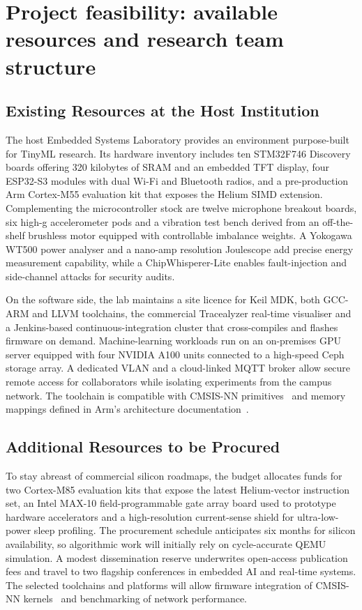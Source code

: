 \section{Project feasibility: available resources and research team structure}

\subsection{Existing Resources at the Host Institution}
The host Embedded Systems Laboratory provides an environment purpose-built for TinyML research. Its hardware inventory includes ten STM32F746 Discovery boards offering 320 kilobytes of SRAM and an embedded TFT display, four ESP32-S3 modules with dual Wi-Fi and Bluetooth radios, and a pre-production Arm Cortex-M55 evaluation kit that exposes the Helium SIMD extension. Complementing the microcontroller stock are twelve microphone breakout boards, six high-g accelerometer pods and a vibration test bench derived from an off-the-shelf brushless motor equipped with controllable imbalance weights. A Yokogawa WT500 power analyser and a nano-amp resolution Joulescope add precise energy measurement capability, while a ChipWhisperer-Lite enables fault-injection and side-channel attacks for security audits.

On the software side, the lab maintains a site licence for Keil MDK, both GCC-ARM and LLVM toolchains, the commercial Tracealyzer real-time visualiser and a Jenkins-based continuous-integration cluster that cross-compiles and flashes firmware on demand. Machine-learning workloads run on an on-premises GPU server equipped with four NVIDIA A100 units connected to a high-speed Ceph storage array. A dedicated VLAN and a cloud-linked MQTT broker allow secure remote access for collaborators while isolating experiments from the campus network. The toolchain is compatible with CMSIS-NN primitives~\cite{arm2023cmsislib} and memory mappings defined in Arm's architecture documentation~\cite{arm2023memmodel}.

\subsection{Additional Resources to be Procured}
To stay abreast of commercial silicon roadmaps, the budget allocates funds for two Cortex-M85 evaluation kits that expose the latest Helium-vector instruction set, an Intel MAX-10 field-programmable gate array board used to prototype hardware accelerators and a high-resolution current-sense shield for ultra-low-power sleep profiling. The procurement schedule anticipates six months for silicon availability, so algorithmic work will initially rely on cycle-accurate QEMU simulation. A modest dissemination reserve underwrites open-access publication fees and travel to two flagship conferences in embedded AI and real-time systems. The selected toolchains and platforms will allow firmware integration of CMSIS-NN kernels~\cite{lai2018cmsisnn} and benchmarking of network performance.

